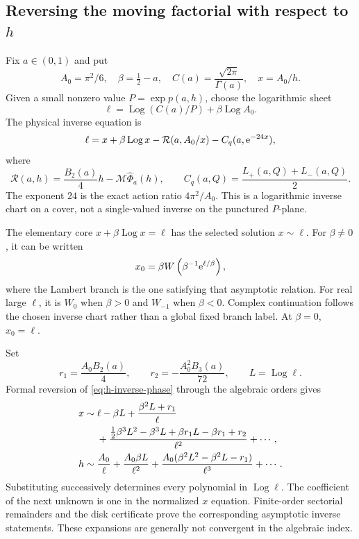 \documentclass[11pt,a4paper]{article}
\numberwithin{equation}{section}
\theoremstyle{definition}
\theoremstyle{remark}\newtheorem{remark}[theorem]{Remark}
\newcommand{\Log}{\operatorname{Log}}\newcommand{\Li}{\operatorname{Li}}
\newcommand{\Med}{\mathcal M}\newcommand{\eps}{\varepsilon}
\begin{document}
\subsection{Reversing the moving factorial with respect to \texorpdfstring{$h$}{h}}
Fix $a\in(0,1)$ and put
\begin{equation}\label{eq:h-core-vars}
 A_0=\pi^2/6,\quad \beta=\tfrac12-a,\quad
 C(a)=\frac{\sqrt{2\pi}}{\Gamma(a)},\quad x=A_0/h.
\end{equation}
Given a small nonzero value $P=\exp p(a,h)$, choose the logarithmic
sheet
\[
 \ell=\Log(C(a)/P)+\beta\Log A_0.
\]
The physical inverse equation is
\begin{equation}\label{eq:h-inverse-phase}
 \ell=x+\beta\Log x-\mathcal R(a,A_0/x)
                     -C_q(a,\e^{-24x}),
\end{equation}
where
\[
 \mathcal R(a,h)=\frac{B_2(a)}4h-\Med\widehat\Phi_a(h),
 \qquad C_q(a,Q)=\frac{L_+(a,Q)+L_-(a,Q)}2.
\]
The exponent $24$ is the exact action ratio $4\pi^2/A_0$.
This is a logarithmic inverse chart on a cover, not a single-valued
inverse on the punctured $P$-plane.

The elementary core $x+\beta\Log x=\ell$ has the selected solution
$x\sim\ell$. For $\beta\ne0$, it can be written
\begin{equation}\label{eq:lambert-core}
 x_0=\beta W\left(\beta^{-1}\mathrm e^{\ell/\beta}\right),
\end{equation}
where the Lambert branch is the one satisfying that asymptotic relation.
For real large $\ell$, it is $W_0$ when $\beta>0$ and $W_{-1}$ when
$\beta<0$. Complex continuation follows the chosen inverse chart rather
than a global fixed branch label. At $\beta=0$, $x_0=\ell$.

Set
\[
 r_1=\frac{A_0 B_2(a)}4,\qquad
 r_2=-\frac{A_0^2 B_3(a)}{72},\qquad L=\Log\ell.
\]
Formal reversion of \eqref{eq:h-inverse-phase} through the algebraic
orders gives
\begin{align}
 x\sim{}&\ell-\beta L+\frac{\beta^2L+r_1}{\ell}\notag\\
 &+\frac{\tfrac12\beta^3L^2-\beta^3L+\beta r_1L-\beta r_1+r_2}
               {\ell^2}+\cdots,\label{eq:x-PL}\\
 h\sim{}&\frac{A_0}{\ell}+\frac{A_0\beta L}{\ell^2}
       +\frac{A_0(\beta^2L^2-\beta^2L-r_1)}{\ell^3}+\cdots.
                \label{eq:h-PL}
\end{align}
Substituting successively determines every polynomial in $\Log\ell$.
The coefficient of the next unknown is one in the normalized $x$
equation. Finite-order sectorial remainders and the disk certificate
prove the corresponding asymptotic inverse statements. These expansions
are generally not convergent in the algebraic index.
\end{document}
